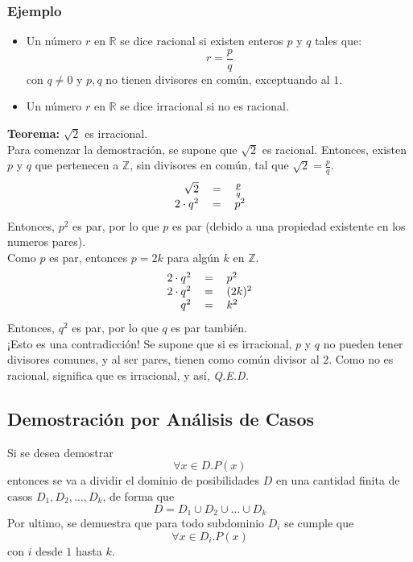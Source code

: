 \documentclass[../main.tex]{subfiles}
\begin{document}
\subsubsection*{Ejemplo}
\begin{itemize}
    \item Un número $r$ en $\mathds{R}$ se dice racional si existen enteros $p$ y $q$ tales que: \[ r = \frac{p}{q} \]con $q \not= 0$ y $p, q$ no tienen divisores en común, exceptuando al $1$.
    \item Un número $r$ en $\mathds{R}$ se dice irracional si no es racional.
\end{itemize}
\textbf{Teorema:} $\sqrt{2}$ es irracional.\\
Para comenzar la demostración, se supone que $\sqrt{2}$ es racional. Entonces, existen $p$ y $q$ que pertenecen a $\mathds{Z}$, sin divisores en común, tal que $\sqrt{2} = \frac{p}{q}$.
\[
    \begin{tabular}{rcl}
        $\sqrt{2}$ & $=$ & $\frac{p}{q}$\\
        $2 \cdot q^2$ & $=$ & $p^2$\\
        
    \end{tabular}
\]
Entonces, $p^2$ es par, por lo que $p$ es par (debido a una propiedad existente en los numeros pares).\\
Como $p$ es par, entonces $p = 2k$ para algún $k$ en $\mathds{Z}$.
\[
    \begin{tabular}{rcl}
        $2 \cdot q^2$ & $=$ & $p^2$\\
        $2 \cdot q^2$ & $=$ & $(2k)^2$\\
        $q^2$ & $=$ & $k^2$\\
    \end{tabular}
\]
Entonces, $q^2$ es par, por lo que $q$ es par también.\\
¡Esto es una contradicción! Se supone que si es irracional, $p$ y $q$ no pueden tener divisores comunes, y al ser pares, tienen como común divisor al $2$. Como no es racional, significa que es irracional, y así, \textit{Q.E.D.}

\subsection{Demostración por Análisis de Casos}
Si se desea demostrar
\[ \forall x \in D . P(x) \]
entonces se va a dividir el dominio de posibilidades $D$ en una cantidad finita de casos $D_{1}, D_{2}, \ldots, D_{k}$, de forma que
\[ D = D_{1} \cup D_{2} \cup \ldots \cup D_{k} \]
Por ultimo, se demuestra que para todo subdominio $D_{i}$ se cumple que
\[ \forall x \in D_{i} . P(x) \]
con $i$ desde $1$ hasta $k$.
\end{document}
